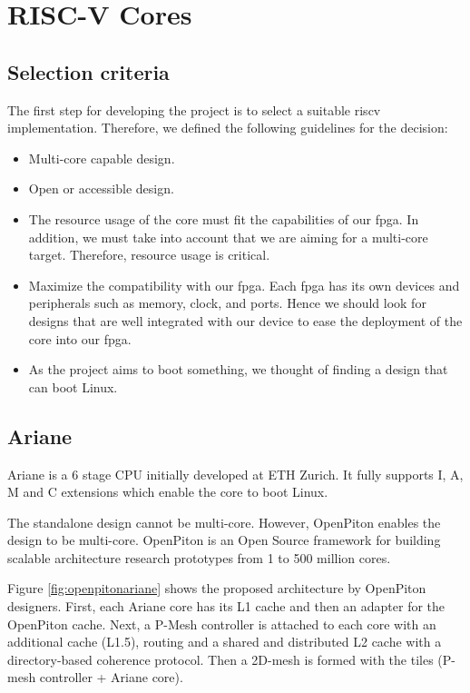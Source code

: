 \section{RISC-V Cores}

\subsection{Selection criteria}
The first step for developing the project is to select a suitable riscv implementation. Therefore, we defined the following guidelines for the decision:
\begin{itemize}
\item Multi-core capable design.
\item Open or accessible design.
\item The resource usage of the core must fit the capabilities of our \gls{fpga}. In addition, we must take into account that we are aiming for a multi-core target. Therefore, resource usage is critical.
\item Maximize the compatibility with our \gls{fpga}. Each \gls{fpga} has its own devices and peripherals such as memory, clock, and ports. Hence we should look for designs that are well integrated with our device to ease the deployment of the core into our \gls{fpga}.
\item As the project aims to boot something, we thought of finding a design that can boot Linux.
\end{itemize}

\subsection{Ariane}
Ariane\cite{arianecore} is a 6 stage CPU initially developed at ETH Zurich. It fully supports I, A, M and C extensions which enable the core to boot Linux.

The standalone design cannot be multi-core. However, OpenPiton enables the design to be multi-core. OpenPiton\cite{openpiton} is an Open Source framework for building scalable architecture research prototypes from 1 to 500 million cores.

Figure \ref{fig:openpitonariane} shows the proposed architecture by OpenPiton designers. First, each Ariane core has its L1 cache and then an adapter for the OpenPiton cache. Next, a P-Mesh controller is attached to each core with an additional cache (L1.5), routing and a shared and distributed L2 cache with a directory-based coherence protocol. Then a 2D-mesh is formed with the tiles (P-mesh controller + Ariane core). 

